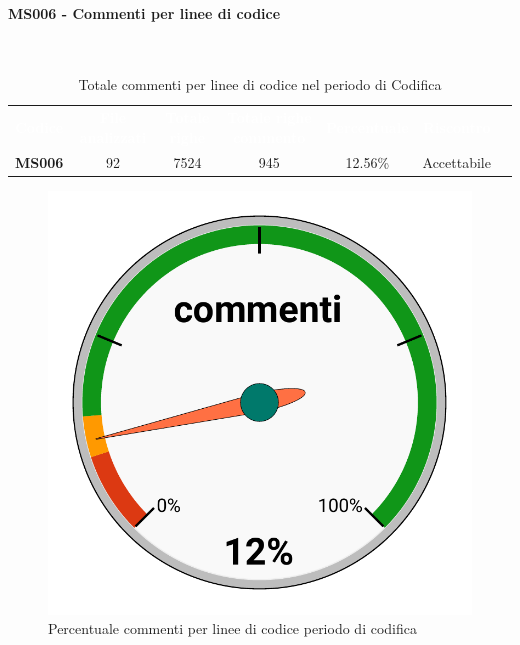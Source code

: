\paragraph{MS006 - Commenti per linee di codice}\mbox{}\\[0,3cm]
    \begin{table}[H]
        \centering
        \begin{tabular}{ccccccc}
            \rowcolor{greySWEight}
            \textcolor{white}{\textbf{Codice}} &
            \textcolor{white}{\textbf{File analizzati}}&
            \textcolor{white}{\textbf{Totale righe}}&
            \textcolor{white}{\textbf{Totale righe commento}}&
            \textcolor{white}{\textbf{Percentuale}}&
            \textcolor{white}{\textbf{Riscontro}}\\
            \textbf{MS006} & 92 & 7524 & 945 & 12.56\% & \textcolor{YellowOrange}{Accettabile}\\
        \end{tabular}
        \caption{Totale commenti per linee di codice nel periodo di Codifica}
    \end{table}
    \begin{figure}[H]
        \centering
        \includegraphics[width=0.3\linewidth]{sez/App_Esito/Qualifica/graph/commenti.pdf}
        \caption{Percentuale commenti per linee di codice periodo di codifica}
    \end{figure}

